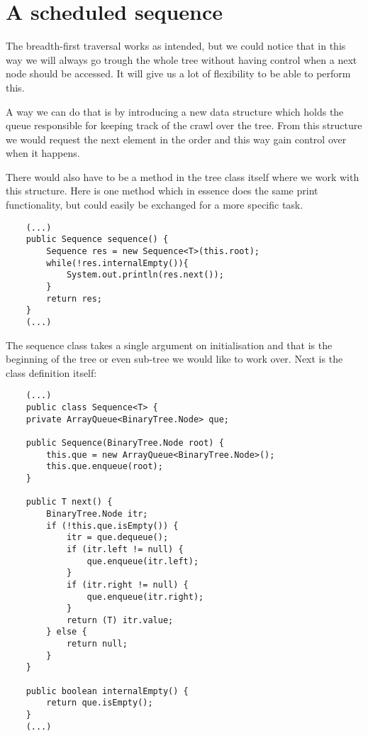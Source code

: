 \documentclass[a4paper,11pt]{article}
\begin{document}
\section*{A scheduled sequence}

The breadth-first traversal works as intended, but we could notice that in this way we will always go trough the whole tree without having control when a next node should be accessed. It will give us a lot of flexibility to be able to perform this.

A way we can do that is by introducing a new data structure which holds the queue responsible for keeping track of the crawl over the tree. From this structure we would request the next element in the order and this way gain control over when it happens.

There would also have to be a method in the tree class itself where we work with this structure. Here is one method which in essence does the same print functionality, but could easily be exchanged for a more specific task.  

\begin{verbatim}
    (...)
    public Sequence sequence() {
        Sequence res = new Sequence<T>(this.root);
        while(!res.internalEmpty()){
            System.out.println(res.next());
        }
        return res;
    }
    (...)
\end{verbatim}

The sequence class takes a single argument on initialisation and that is the beginning of the tree or even sub-tree we would like to work over.
Next is the class definition itself:

\begin{verbatim}
    (...)
    public class Sequence<T> {
    private ArrayQueue<BinaryTree.Node> que;
    
    public Sequence(BinaryTree.Node root) {
        this.que = new ArrayQueue<BinaryTree.Node>();
        this.que.enqueue(root);
    }

    public T next() {
        BinaryTree.Node itr;
        if (!this.que.isEmpty()) {
            itr = que.dequeue();
            if (itr.left != null) {
                que.enqueue(itr.left);
            }
            if (itr.right != null) {
                que.enqueue(itr.right);
            }
            return (T) itr.value;
        } else {
            return null;
        }
    }
    
    public boolean internalEmpty() {
        return que.isEmpty();
    }
    (...)
\end{verbatim}
\end{document}
